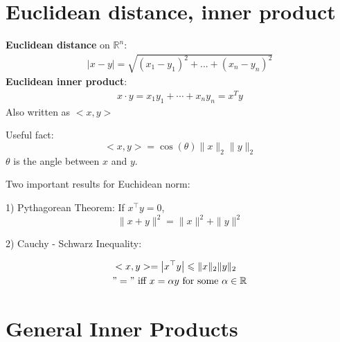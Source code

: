 \documentclass[11pt]{elegantbook}
\begin{document}
\section{ Euclidean distance, inner product}
\textbf{Euclidean distance} on $\mathbb{R}^n$:
\begin{equation}
    \begin{aligned}
        |x-y|=\sqrt{(x_1-y_1)^2+...+(x_n-y_n)^2}
    \end{aligned}
    \nonumber
\end{equation}
\textbf{Euclidean inner product}:
\begin{equation}
    \begin{aligned}
        x\cdot y=x_1y_1+\cdots +x_ny_n=x^Ty
    \end{aligned}
    \nonumber
\end{equation}
Also written as $<x,y>$

Useful fact: $$<x,y>=\cos(\theta)\|x\|_2\|y\|_2$$
$\theta$ is the angle between $x$ and $y$.

Two important results for Euchidean norm:

1) Pythagorean Theorem: If $x^{\top} y=0$,
\[ \|x+y\|^{2}=\|x\|^{2}+\|y\|^{2} \]

2) Cauchy - Schwarz Inequality:

$$
\begin{aligned}
&<x,y>=\left|x^{\top} y\right| \leqslant\|x\|_2\|y\|_2 \\
&"=" \text { iff } x=\alpha y \text { for some } \alpha \in \mathbb{R}
\end{aligned}
$$

\section{General Inner Products}
\end{document}
